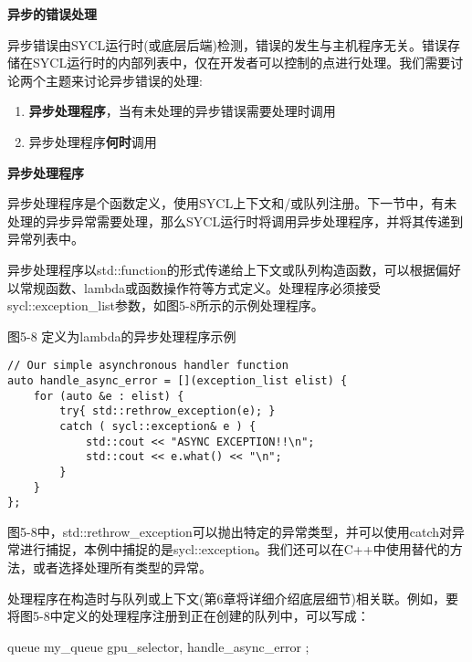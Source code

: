 \hspace*{\fill} \par %
\textbf{异步的错误处理}

异步错误由SYCL运行时(或底层后端)检测，错误的发生与主机程序无关。错误存储在SYCL运行时的内部列表中，仅在开发者可以控制的点进行处理。我们需要讨论两个主题来讨论异步错误的处理:\par

\begin{enumerate}
	\item \textbf{异步处理程序}，当有未处理的异步错误需要处理时调用
	\item 异步处理程序\textbf{何时}调用
\end{enumerate}

\hspace*{\fill} \par %
\textbf{异步处理程序}

异步处理程序是个函数定义，使用SYCL上下文和/或队列注册。下一节中，有未处理的异步异常需要处理，那么SYCL运行时将调用异步处理程序，并将其传递到异常列表中。\par

异步处理程序以std::function的形式传递给上下文或队列构造函数，可以根据偏好以常规函数、lambda或函数操作符等方式定义。处理程序必须接受sycl::exception\_list参数，如图5-8所示的示例处理程序。\par

\hspace*{\fill} \par %
图5-8 定义为lambda的异步处理程序示例
\begin{lstlisting}[caption={}]
// Our simple asynchronous handler function
auto handle_async_error = [](exception_list elist) {
	for (auto &e : elist) {
		try{ std::rethrow_exception(e); }
		catch ( sycl::exception& e ) {
			std::cout << "ASYNC EXCEPTION!!\n";
			std::cout << e.what() << "\n";
		}
	}
};
\end{lstlisting}

图5-8中，std::rethrow\_exception可以抛出特定的异常类型，并可以使用catch对异常进行捕捉，本例中捕捉的是sycl::exception。我们还可以在C++中使用替代的方法，或者选择处理所有类型的异常。\par

处理程序在构造时与队列或上下文(第6章将详细介绍底层细节)相关联。例如，要将图5-8中定义的处理程序注册到正在创建的队列中，可以写成：\par

queue my\_queue{ gpu\_selector{}, handle\_async\_error };\par

